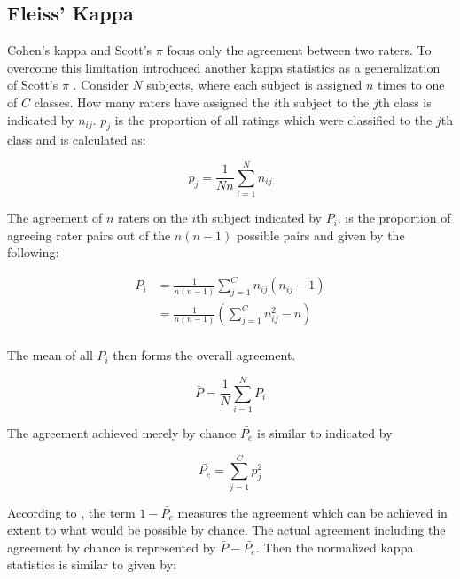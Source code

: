 \subsection{Fleiss' Kappa}
\label{chp:fundamentals:sec:inter_rater_agreement:subsec:fleiss_kappa}
Cohen's kappa and Scott's $\pi$ focus only the agreement between two raters.
To overcome this limitation \textcite{Fleiss:1971} introduced another kappa statistics as a generalization of Scott's $\pi$ \parencite{Scott:1955}.
Consider $N$ subjects, where each subject is assigned $n$ times to one of $C$ classes.
How many raters have assigned the $i$th subject to the $j$th class is indicated by $n_{ij}$.
$p_j$ is the proportion of all ratings which were classified to the $j$th class and is calculated as:

\begin{equation}\label{eq:fleiss_pj}
    p_j = \frac{1}{Nn}\sum_{i=1}^N n_{ij}
\end{equation}

The agreement of $n$ raters on the $i$th subject indicated by $P_i$, is the proportion of agreeing rater pairs out of the $n(n-1)$ possible pairs and given by the following:

\begin{equation}\label{eq:fleiss_Pi}
    \begin{aligned}
        P_i &= \frac{1}{n(n-1)} \sum_{j=1}^C n_{ij} (n_{ij}-1) \\
        &= \frac{1}{n(n-1)} (\sum_{j=1}^C n_{ij}^2 - n)\\
    \end{aligned}
\end{equation}

The mean of all $P_i$ then forms the overall agreement.

\begin{equation}\label{eq:fleiss_P_bar}
    \bar{P} = \frac{1}{N} \sum_{i=1}^N P_i
\end{equation}

The agreement achieved merely by chance $\bar{P_e}$ is similar to \textcite{Scott:1955} indicated by

\begin{equation}\label{eq:fleiss_P_e}
    \bar{P_e} = \sum_{j=1}^C p_j^2
\end{equation}

According to \textcite{Fleiss:1971}, the term $1-\bar{P_e}$ measures the agreement which can be achieved in extent to what would be possible by chance.
The actual agreement including the agreement by chance is represented by $\bar{P} - \bar{P_e}$.
Then the normalized kappa statistics is similar to \textcite{Cohen:1960} given by:

